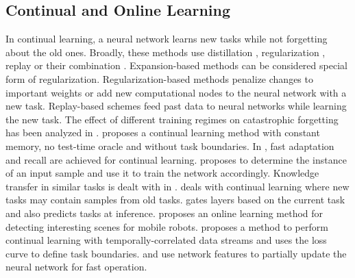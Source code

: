\documentclass[lettersize,journal]{IEEEtran}
\begin{document}
 \subsection{Continual and Online Learning}
\noindent In continual learning, a neural network learns new tasks while not forgetting about the old ones. Broadly, these methods use distillation \cite{li2017learning, fini2020online}, regularization \cite{kirkpatrick2017overcoming, aljundi2018memory}, replay \cite{shin2017continual, gupta2020maml} or their combination \cite{pan2020continual}. Expansion-based methods can be considered special form of regularization. Regularization-based methods penalize changes to important weights or add new computational nodes to the neural network with a new task. Replay-based schemes feed past data to neural networks while learning the new task. The effect of different training regimes on catastrophic forgetting has been analyzed in \cite{mirzadeh2020understanding}. \cite{buzzega2020dark} proposes a continual learning method with constant memory, no test-time oracle and without task boundaries. In \cite{caccia2020online}, fast adaptation and recall are achieved for continual learning. \cite{chen2020mitigating} proposes to determine the instance of an input sample and use it to train the network accordingly. Knowledge transfer in similar tasks is dealt with in \cite{ke2020continual}. \cite{he2020incremental} deals with continual learning where new tasks may contain samples from old tasks. \cite{abati2020conditional} gates layers based on the current task and also predicts tasks at inference. \cite{wang2020visual} proposes an online learning method for detecting interesting scenes for mobile robots. \cite{chrysakis2020online} proposes a method to perform continual learning with temporally-correlated data streams and \cite{aljundi2019task} uses the loss curve to define task boundaries. \cite{hayes2020remind} and \cite{pellegrini2020latent} use network features to partially update the neural network for fast operation.
 
\end{document}
